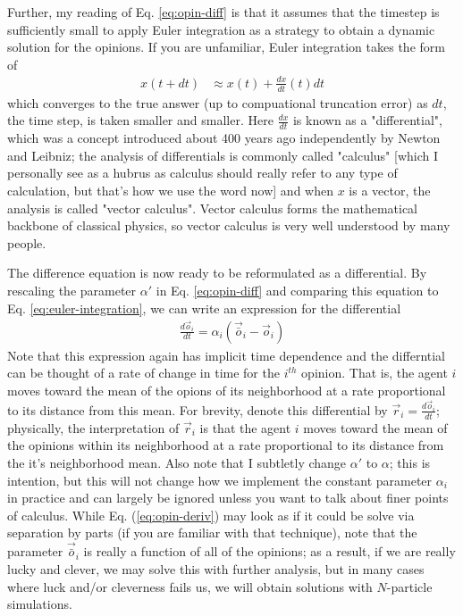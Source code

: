 \documentclass{article}
\begin{document}
Further,  
my reading of Eq. \ref{eq:opin-diff} is that it assumes that the
timestep is sufficiently small to apply Euler integration as a strategy to obtain a
dynamic solution for the opinions.  If you are unfamiliar,
Euler integration takes the form of 
\begin{align}
    x(t+dt) &\approx x(t) + \frac{dx}{dt}(t) dt\label{eq:euler-integration}
\end{align}
which converges to the true answer (up to compuational truncation error) as $dt$, the time step,
is taken smaller and smaller.  Here $\frac{dx}{dt}$ is known as a "differential", which
was a concept introduced about 400 years ago independently by Newton and Leibniz; the analysis of
differentials is commonly called "calculus" [which I personally see as a hubrus as calculus should
really refer to any type of calculation, but that's how we use the word now]
and when $x$ is a vector, the analysis is called "vector calculus".  Vector calculus forms the
mathematical backbone of classical physics, so vector calculus is very well understood by many people.

The difference equation is now ready to be reformulated as a differential.
By rescaling the parameter $\alpha'$ in Eq. \ref{eq:opin-diff} and comparing this equation to Eq.
\ref{eq:euler-integration}, we can write an expression for the differential
\begin{align}
    \frac{d {\vec{o}}_i}{dt} = \alpha_i ({\vec{\bar{o}}}_i - {\vec{o}}_i) \label{eq:opin-deriv}
\end{align}
Note that this expression again has implicit time dependence and the differntial can be
thought of a rate of change in time for the $i^{th}$ opinion.
That is, the agent $i$ moves toward the mean of the opions of its neighborhood at a rate proportional
to its distance from this mean.
For brevity, denote this differential by ${\vec{r}}_i = \frac{d {\vec{o}}_i}{dt}$;
physically, the interpretation of ${\vec{r}}_i$ is that the agent $i$ moves toward
the mean of the opinions within its neighborhood at a rate proportional
to its distance from the it's neighborhood mean.
Also note that I subtletly change $\alpha'$ to $\alpha$; this is intention, but
this will not change how we implement the constant parameter $\alpha_i$ in practice and
can largely be ignored unless you want to talk about finer points of calculus. 
While Eq. (\ref{eq:opin-deriv}) may look as if it could be solve via separation by parts (if
you are familiar with that technique), note that
the parameter ${\vec{\bar{o}}}_i$ is really a function of all of the opinions; as a result,
if we are really lucky and clever, we may solve this with further analysis, but in many cases
where luck and/or cleverness fails us, we will obtain solutions with $N$-particle simulations.
\end{document}
